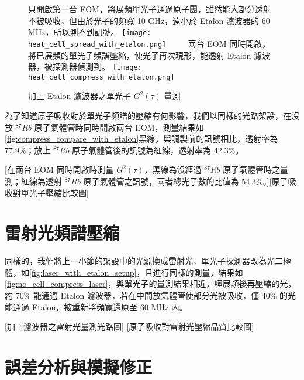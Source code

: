 \documentclass[class=NCU_thesis, crop=false]{standalone}
\begin{document}
\begin{figure}[!hbt]
    \centering
    \subcaptionbox
        {只開啟第一台 EOM，將展頻單光子通過原子團，雖然能大部分透射不被吸收，但由於光子的頻寬 10 GHz，遠小於 Etalon 濾波器的 60 MHz，所以測不到訊號。
        \label{fig:spread_single_photon_with_etalon}}
        {\texttt{[image: heat\_cell\_spread\_with\_etalon.png]}}
    ~~~~
    \subcaptionbox
        {兩台 EOM 同時開啟，將已展頻的單光子頻譜壓縮，使光子再次現形，能透射 Etalon 濾波器，被探測器偵測到。
        \label{fig:compress_single_photon_with_etalon}}
        {\texttt{[image: heat\_cell\_compress\_with\_etalon.png]}}
    \caption{加上 Etalon 濾波器之單光子 $G^{2}(\tau)$ 量測}
    \label{fig:single_photon_with_etalon}
\end{figure}

為了知道原子吸收對於單光子頻譜的壓縮有何影響，我們以同樣的光路架設，在沒放 $^{87}Rb$ 原子氣體管時同時開啟兩台 EOM，測量結果如\cref{fig:compress_compare_with_etalon}黑線，與調製前的訊號相比，透射率為 77.9\%；放上 $^{87}Rb$ 原子氣體管後的訊號為紅線，透射率為 42.3\%。

[在兩台 EOM 同時開啟時測量 $G^{2}(\tau)$，黑線為沒經過 $^{87}Rb$ 原子氣體管時之量測；紅線為透射 $^{87}Rb$ 原子氣體管之訊號，兩者總光子數的比值為 54.3\%。][原子吸收對單光子壓縮比較圖]

\section{雷射光頻譜壓縮}

同樣的，我們將上一小節的架設中的光源換成雷射光，單光子探測器改為光二極體，如\cref{fig:laser_with_etalon_setup}，且進行同樣的測量，結果如\cref{fig:no_cell_compress_laser}，與單光子的量測結果相近，經展頻後再壓縮的光，約 70\% 能通過 Etalon 濾波器，若在中間放氣體管使部分光被吸收，僅 40\% 的光能通過 Etalon，被重新將頻寬還原至 60 MHz 內。

[加上濾波器之雷射光量測光路圖]
[原子吸收對雷射光壓縮品質比較圖]

\section{誤差分析與模擬修正}
\end{document}
